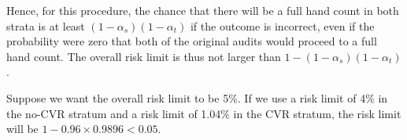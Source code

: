 Hence, for this procedure, the chance that there will be a full hand count in both strata is at least 
$(1-\alpha_s)(1-\alpha_t)$ if the outcome is incorrect,
even if the probability were zero that both of the original audits would proceed to a full hand count.
The overall risk limit is thus not larger than $1 - (1-\alpha_s)(1-\alpha_t)$.

Suppose we want the overall risk limit to be 5\%. 
If we use a risk limit of 4\% in the no-CVR stratum and a risk limit of 1.04\% in the CVR stratum,
the risk limit will be $1 - 0.96\times 0.9896 < 0.05$.

